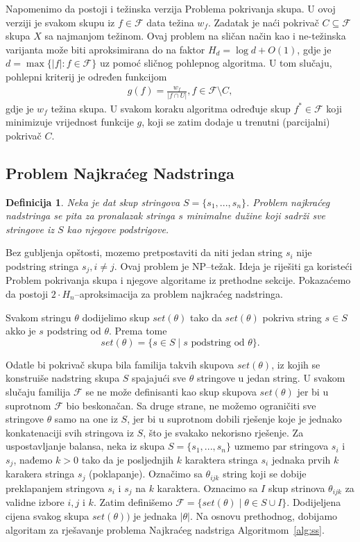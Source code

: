 \documentclass[a4paper, utf8, 11pt, colorlinks]{book}
\newtheorem{definition}{Definicija}
\begin{document}
Napomenimo da postoji i težinska verzija Problema pokrivanja skupa. U ovoj verziji je svakom skupu iz $f \in\mathcal{F}$ data težina $w_f$. Zadatak je naći pokrivač $C \subseteq \mathcal{F}$ skupa $X$ sa najmanjom težinom. Ovaj problem na sličan način kao i ne-težinska varijanta može biti aproksimirana do na faktor $H_d= \log d+O(1)$, gdje je $d= \max\{|f|:f \in \mathcal{F}\}$ uz pomoć sličnog pohlepnog algoritma. U tom slučaju, pohlepni kriterij je određen funkcijom 
\begin{align}
	g(f) = \frac{w_f}{|f \cap U|}, f \in \mathcal{F}\setminus C,
\end{align}
gdje je $w_f$ težina skupa. U svakom koraku algoritma određuje skup $f^* \in \mathcal{F}$ koji minimizuje vrijednost funkcije $g$, koji se zatim dodaje u trenutni (parcijalni) pokrivač $C$.

\subsection{Problem Najkraćeg Nadstringa}


\begin{definition}
   Neka je dat skup stringova $S=\{s_1,...,s_n\}$. Problem najkraćeg nadstringa se pita za pronalazak stringa $s$ minimalne dužine koji sadrži sve stringove iz $S$ kao njegove podstrigove. 
  \end{definition}
Bez gubljenja opštosti, mozemo pretpostaviti da niti jedan string $s_i$ nije podstring stringa $s_j, i\neq j$.
Ovaj problem je NP--težak. Ideja je riješiti ga koristeći Problem pokrivanja skupa i 
njegove algoritame iz prethodne sekcije. Pokazaćemo da postoji $2\cdot H_n$--aproksimacija za problem najkraćeg nadstringa. 

 Svakom stringu $\theta$ dodijelimo skup $set(\theta)$ tako da   $set(\theta)$ pokriva string $s\in S$ akko 
je $s$ podstring od $\theta$. Prema tome 
$$set(\theta) = \{ s \in S \mid s \mbox{  podstring od }\theta \}.$$

 Odatle bi pokrivač skupa bila familija takvih skupova $set(\theta)$, iz kojih se konstruiše nadstring skupa $S$ spajajući sve $\theta$ stringove u jedan string. U svakom slučaju familija  $\mathcal{F}$ se ne može definisanti kao skup skupova $set(\theta)$ jer bi u suprotnom $\mathcal{F}$ bio beskonačan. Sa druge strane, ne možemo ograničiti sve stringove $\theta$ samo na one iz $S$, jer bi u suprotnom dobili rješenje koje je jednako konkatenaciji svih stringova iz $S$, što je svakako nekorisno rješenje. Za uspostavljanje balansa, neka iz skupa $S=\{s_1,...,s_n\}$ uzmemo par stringova $s_i$ i $s_j$, nađemo $k>0$  tako da je posljednjih $k$ karaktera stringa $s_i$ jednaka prvih $k$ karakera stringa $s_j$ (poklapanje). Označimo sa $\theta_{ijk}$ string koji se 
dobije preklapanjem stringova $s_i$ i $s_j$ na $k$ karaktera. Oznacimo sa $I$ skup strinova $\theta_{ijk}$  za validne izbore $i,j$ i $k$. Zatim definišemo $\mathcal{F}=\{set(\theta) \mid  \theta \in S \cup I\}$. Dodijeljena cijena svakog skupa $set(\theta))$ je jednaka $|\theta|$. Na osnovu prethodnog, dobijamo algoritam za rješavanje problema Najkraćeg nadstriga Algoritmom~\ref{alg:ss}. 
\end{document}
